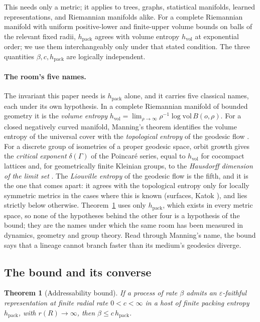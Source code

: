 \documentclass[11pt,reqno]{amsart}
\theoremstyle{plain}
\newtheorem{theorem}{Theorem}[section]
\theoremstyle{definition}
\newcommand{\hpack}{h_{\mathrm{pack}}}
\newcommand{\hvol}{h_{\mathrm{vol}}}
\newcommand{\eps}{\varepsilon}
\begin{document}
This needs only a metric; it applies to trees, graphs, statistical manifolds, learned representations, and Riemannian manifolds alike. For a complete Riemannian manifold with uniform positive-lower and finite-upper volume bounds on balls of the relevant fixed radii, $\hpack$ agrees with volume entropy $\hvol$ at exponential order; we use them interchangeably only under that stated condition. The three quantities $\beta,c,\hpack$ are logically independent.

\paragraph{The room's five names.}
The invariant this paper needs is $\hpack$ alone, and it carries five classical names, each under its own hypothesis. In a complete Riemannian manifold of bounded geometry it is the \emph{volume entropy} $\hvol=\lim_{\rho\to\infty}\rho^{-1}\log\mathrm{vol}\,B(o,\rho)$. For a closed negatively curved manifold, Manning's theorem identifies the volume entropy of the universal cover with the \emph{topological entropy} of the geodesic flow \cite{manning1979}. For a discrete group of isometries of a proper geodesic space, orbit growth gives the \emph{critical exponent} $\delta(\Gamma)$ of the Poincar\'e series, equal to $\hvol$ for cocompact lattices \cite{patterson1976,sullivan1979} and, for geometrically finite Kleinian groups, to the \emph{Hausdorff dimension of the limit set} \cite{bishopjones1997}. The \emph{Liouville entropy} of the geodesic flow is the fifth, and it is the one that comes apart: it agrees with the topological entropy only for locally symmetric metrics in the cases where this is known (surfaces, Katok \cite{katok1982}), and lies strictly below otherwise. Theorem~\ref{thm:bound} uses only $\hpack$, which exists in every metric space, so none of the hypotheses behind the other four is a hypothesis of the bound; they are the names under which the same room has been measured in dynamics, geometry and group theory. Read through Manning's name, the bound says that a lineage cannot branch faster than its medium's geodesics diverge.

\subsection{The bound and its converse}

\begin{theorem}[Addressability bound]\label{thm:bound}
If a process of rate $\beta$ admits an $\eps$-faithful representation at finite radial rate $0<c<\infty$ in a host of finite packing entropy $\hpack$, with $r(R)\to\infty$, then $\beta\le c\,\hpack$.
\end{theorem}
\end{document}
